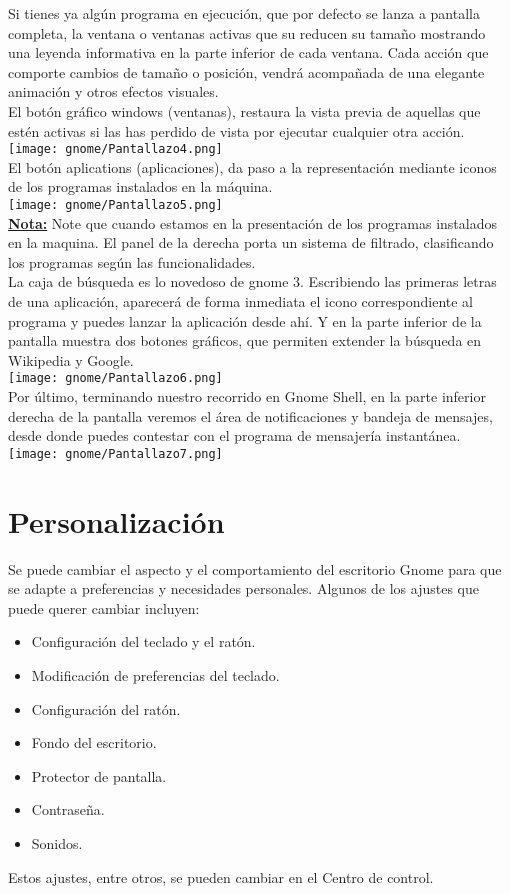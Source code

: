 \documentclass[12pt,letterpaper]{book}
\begin{document}
\begin{itemize}
\begin{itemize}
\end{itemize}
Si tienes ya algún programa en ejecución, que por defecto se lanza a pantalla completa, la ventana o ventanas activas que su reducen su tamaño mostrando una leyenda informativa en la parte inferior de cada ventana. Cada acción que comporte cambios de tamaño o posición, vendrá acompañada de una elegante animación y otros efectos visuales.\\
El botón gráfico windows (ventanas), restaura la vista previa de aquellas que estén activas si las has perdido de vista por ejecutar cualquier otra acción.\\
\texttt{[image: gnome/Pantallazo4.png]}\\ 

El botón aplications (aplicaciones), da paso a la representación mediante iconos de los programas instalados en la máquina.\\

\texttt{[image: gnome/Pantallazo5.png]} \\
\underline{\bf Nota:} Note que cuando estamos en la presentación de los programas instalados en la maquina. El panel de la derecha porta un sistema de filtrado, clasificando los programas según las funcionalidades.\\
\newpage
La caja de búsqueda es lo novedoso de gnome 3. Escribiendo las primeras letras de una aplicación, aparecerá de forma inmediata el icono correspondiente al programa y puedes lanzar la aplicación desde ahí. Y en la parte inferior de la pantalla muestra dos botones gráficos, que permiten extender la búsqueda en Wikipedia y Google.\\ 

\texttt{[image: gnome/Pantallazo6.png]}\\ 
\newpage
Por último, terminando nuestro recorrido en Gnome Shell, en la parte inferior derecha de la pantalla veremos el área de notificaciones y bandeja de mensajes, desde donde puedes contestar con el programa de mensajería instantánea.\\
\texttt{[image: gnome/Pantallazo7.png]} 
\end{itemize}
\chapter{Personalización}
Se puede cambiar el aspecto y el comportamiento del escritorio Gnome para que se adapte a preferencias y necesidades personales. Algunos de los ajustes que puede querer cambiar incluyen:
\begin{itemize}
\item Configuración del teclado y el ratón.
\item Modificación de preferencias del teclado.
\item Configuración del ratón.
\item Fondo del escritorio.
\item Protector de pantalla.
\item Contraseña.
\item Sonidos.
\end{itemize}
Estos ajustes, entre otros, se pueden cambiar en el Centro de control.
\end{document}
